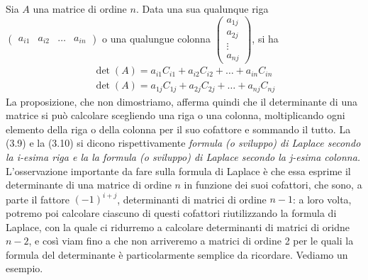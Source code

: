\begin{proposizione}
  Sia $A$ una matrice di ordine $n$. Data una sua qualunque riga $\begin{pmatrix} a_{i1} & a_{i2} & \dots & a_{in} \end{pmatrix}$ o una qualungue colonna $\begin{pmatrix} a_{1j} \\ a_{2j} \\ \vdots \\ a_{nj} \end{pmatrix}$, si ha
  \begin{eqnarray}
    \det(A)=a_{i1}C_{i1}+a_{i2}C_{i2}+\dots+a_{in}C_{in}\\
    \det(A)=a_{1j}C_{1j}+a_{2j}C_{2j}+\dots+a_{nj}C_{nj}
  \end{eqnarray}
  La proposizione, che non dimostriamo, afferma quindi che il determinante di una matrice si può calcolare scegliendo una riga o una colonna, moltiplicando ogni elemento della riga o della colonna per il suo cofattore e sommando il tutto. La (3.9) e la (3.10) si dicono rispettivamente \textit{formula (o sviluppo) di Laplace secondo la i-esima riga e la la formula (o sviluppo) di Laplace secondo la j-esima colonna.}\\
  L'osservazione importante da fare sulla formula di Laplace è che essa esprime il determinante di una matrice di ordine $n$ in funzione dei suoi cofattori, che sono, a parte il fattore $(-1)^{i+j}$, determinanti di matrici di ordine $n-1$: a loro volta, potremo poi calcolare ciascuno di questi cofattori riutilizzando la formula di Laplace, con la quale ci ridurremo a calcolare determinanti di matrici di oridne $n - 2$, e così viam fino a che non arriveremo a matrici di ordine 2 per le quali la formula del determinante è particolarmente semplice da ricordare. Vediamo un esempio.
\end{proposizione}
